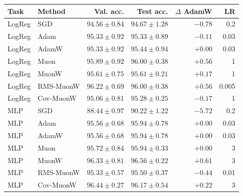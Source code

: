 \footnotesize
\begin{tabular}{llrrrr}
\toprule
Task & Method & Val. acc. & Test acc. & $\Delta$ AdamW & LR \\
\midrule
LogReg & SGD & $94.56 \pm 0.84$ & $94.67 \pm 1.28$ & $-0.78$ & 0.2 \\
LogReg & Adam & $95.33 \pm 0.92$ & $95.33 \pm 0.89$ & $-0.11$ & 0.03 \\
LogReg & AdamW & $95.33 \pm 0.92$ & $95.44 \pm 0.94$ & $+0.00$ & 0.03 \\
LogReg & Muon & $95.89 \pm 0.92$ & $96.00 \pm 0.38$ & $+0.56$ & 1 \\
LogReg & MuonW & $95.61 \pm 0.75$ & $95.61 \pm 0.21$ & $+0.17$ & 1 \\
LogReg & RMS-MuonW & $96.22 \pm 0.69$ & $96.00 \pm 0.38$ & $+0.56$ & 0.005 \\
LogReg & Cov-MuonW & $95.06 \pm 0.81$ & $95.28 \pm 0.25$ & $-0.17$ & 1 \\
\midrule
MLP & SGD & $88.44 \pm 0.97$ & $90.22 \pm 1.22$ & $-5.72$ & 0.2 \\
MLP & Adam & $95.56 \pm 0.68$ & $95.94 \pm 0.78$ & $+0.00$ & 0.03 \\
MLP & AdamW & $95.56 \pm 0.68$ & $95.94 \pm 0.78$ & $+0.00$ & 0.03 \\
MLP & Muon & $95.72 \pm 0.84$ & $95.94 \pm 0.33$ & $+0.00$ & 3 \\
MLP & MuonW & $96.33 \pm 0.81$ & $96.56 \pm 0.22$ & $+0.61$ & 3 \\
MLP & RMS-MuonW & $95.33 \pm 0.57$ & $95.50 \pm 0.37$ & $-0.44$ & 0.01 \\
MLP & Cov-MuonW & $96.44 \pm 0.27$ & $96.17 \pm 0.54$ & $+0.22$ & 3 \\
\bottomrule
\end{tabular}
